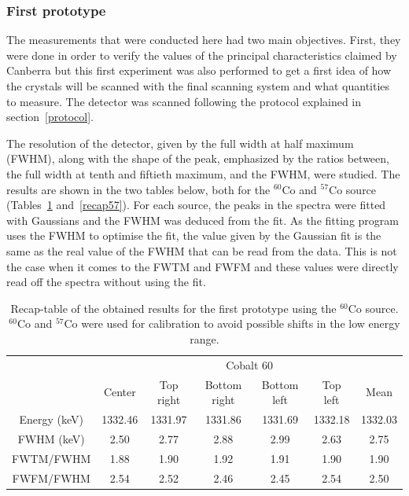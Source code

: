 \documentclass[11pt,a4paper]{article}
\begin{document}
\subsubsection{First prototype}

The measurements that were conducted here had two main objectives. First, they were done in order to verify the values of the principal characteristics claimed by Canberra but this first experiment was also performed to get a first idea of how the crystals will be scanned with the final scanning system and what quantities to measure. The detector was scanned following the protocol explained in section~\ref{protocol}.

The resolution of the detector, given by the full width at half maximum (FWHM), along with the shape of the peak, emphasized by the ratios between, the full width at tenth and fiftieth maximum, and the FWHM, were studied. The results are shown in the two tables below, both for the $^{60}$Co and $^{57}$Co source (Tables~\ref{recap60} and~\ref{recap57}). For each source, the peaks in the spectra were fitted with Gaussians and the FWHM was deduced from the fit. As the fitting program uses the FWHM to optimise the fit, the value given by the Gaussian fit is the same as the real value of the FWHM that can be read from the data. This is not the case when it comes to the FWTM and FWFM and these values were directly read off the spectra without using the fit.

\begin{table}[!h]
\centering
\caption{Recap-table of the obtained results for the first prototype using the $^{60}$Co source. $^{60}$Co and $^{57}$Co were used for calibration to avoid possible shifts in the low energy range.}
\label{recap60}
\begin{tabular}{c|c|c|c|c|c|c|}
\cline{2-7}
                                   & \multicolumn{6}{c|}{Cobalt 60}                                        \\ \cline{2-7} 
                                   & Center  & Top right & Bottom right & Bottom left & Top left & Mean    \\ \hline
\multicolumn{1}{|c|}{Energy (keV)} & 1332.46 & 1331.97   & 1331.86      & 1331.69     & 1332.18  & 1332.03 \\ \hline
\multicolumn{1}{|c|}{FWHM (keV)}   & 2.50    & 2.77      & 2.88         & 2.99        & 2.63     & 2.75    \\ \hline
\multicolumn{1}{|c|}{FWTM/FWHM}    & 1.88    & 1.90      & 1.92         & 1.91        & 1.90     & 1.90    \\ \hline
\multicolumn{1}{|c|}{FWFM/FWHM}    & 2.54    & 2.52      & 2.46         & 2.45        & 2.54     & 2.50    \\ \hline
\end{tabular}
\end{table}
\end{document}
